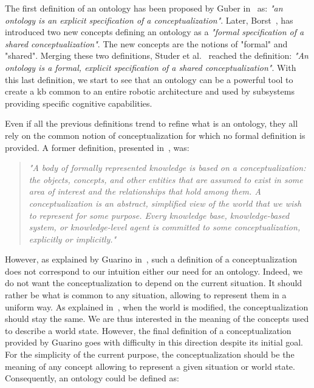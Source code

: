 The first definition of an ontology has been proposed by Guber in~\cite{guber_1993_translational} as: \textit{"an ontology is an explicit specification of a conceptualization"}. Later, Borst~\cite{borst_1999_construction}, has introduced two new concepts defining an ontology as a \textit{"formal specification of a shared conceptualization"}. The new concepts are the notions of "formal" and "shared". Merging these two definitions, Studer et al.~\cite{studer_1998_knowledge} reached the definition: \textit{"An ontology is a formal, explicit specification of a shared conceptualization"}. With this last definition, we start to see that an ontology can be a powerful tool to create a \acrfull{kb} common to an entire robotic architecture and used by subsystems providing specific cognitive capabilities.

Even if all the previous definitions trend to refine what is an ontology, they all rely on the common notion of conceptualization for which no formal definition is provided. A former definition, presented in~\cite{genesereth_1987_logical}, was:

\begin{quote} 
\centering 
\textit{
"A body of formally represented knowledge is based on a conceptualization: the objects, concepts, and other entities that are assumed to exist in some area of interest and the relationships that hold among them. A conceptualization is an abstract, simplified view of the world that we wish to represent for some purpose. Every knowledge base, knowledge-based system, or knowledge-level agent is committed to some conceptualization, explicitly or implicitly."}
\end{quote}

However, as explained by Guarino in~\cite{guarino_2009_ontology}, such a definition of a conceptualization does not correspond to our intuition either our need for an ontology. Indeed, we do not want the conceptualization to depend on the current situation. It should rather be what is common to any situation, allowing to represent them in a uniform way. As explained in~\cite{guarino_1995_towards}, when the world is modified, the conceptualization should stay the same. We are thus interested in the meaning of the concepts used to describe a world state. However, the final definition of a conceptualization provided by Guarino goes with difficulty in this direction despite its initial goal. For the simplicity of the current purpose, the conceptualization should be the meaning of any concept allowing to represent a given situation or world state. Consequently, an ontology could be defined as:

